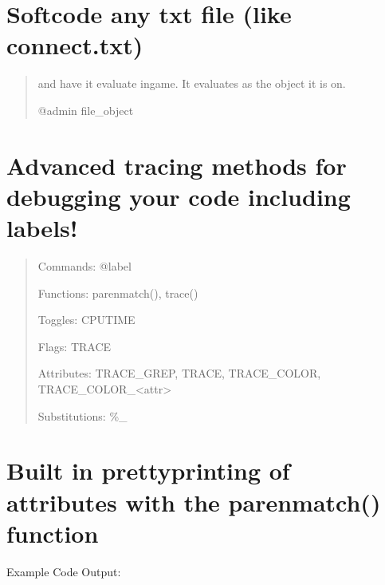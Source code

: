 \documentclass[letterpaper,10pt,english]{sphinxmanual}
\begin{document}
\section{Softcode any txt file (like connect.txt)}
\label{\detokenize{features:softcode-any-txt-file-like-connect-txt}}\begin{quote}

\sphinxAtStartPar
and have it evaluate in\sphinxhyphen{}game.  It evaluates as the object it is on.

\sphinxAtStartPar
@admin file\_object
\end{quote}


\section{Advanced tracing methods for debugging your code including labels!}
\label{\detokenize{features:advanced-tracing-methods-for-debugging-your-code-including-labels}}\begin{quote}

\sphinxAtStartPar
Commands: @label

\sphinxAtStartPar
Functions: parenmatch(), trace()

\sphinxAtStartPar
Toggles: CPUTIME

\sphinxAtStartPar
Flags: TRACE

\sphinxAtStartPar
Attributes: TRACE\_GREP, TRACE, TRACE\_COLOR, TRACE\_COLOR\_\textless{}attr\textgreater{}

\sphinxAtStartPar
Substitutions: \%\_
\end{quote}


\section{Built in pretty\sphinxhyphen{}printing of attributes with the parenmatch() function}
\label{\detokenize{features:built-in-pretty-printing-of-attributes-with-the-parenmatch-function}}
\sphinxAtStartPar
Example Code Output:
\end{document}
